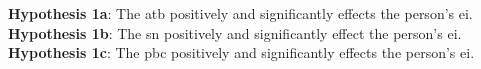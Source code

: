 \textbf{Hypothesis 1a}: The \acl{atb} positively and significantly effects the person's \acl{ei}.\\
\textbf{Hypothesis 1b}: The \acl{sn} positively and significantly effect the person's \acl{ei}.\\
\textbf{Hypothesis 1c}: The \acl{pbc} positively and significantly effects the person's \acl{ei}.\\
